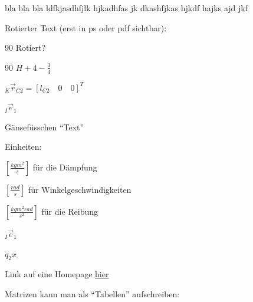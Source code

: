 \begin{list}{\bullet}{
 \setlength{\leftmargin}{4cm}
 \setlength{\labelsep}{1cm}
 \setlength{\labelwidth}{4cm}}

\item[Punkt 1] bla bla bla ldfkjasdhfjlk hjkadhfas jk
dkashfjkas hjkdf hajks ajd jkf

\item[Punkt 2]

\item[Punkt 3]

\end{list}





Rotierter Text (erst in ps oder pdf sichtbar):

\begin{rotate}{90}
Rotiert?
\end{rotate}

\vspace{2cm}

\begin{rotate}{90}
$H + 4 -\frac{3}{4}$
\end{rotate}




$_K\vec{r}_{C2} = [l_{C2} \quad 0 \quad 0 ]^T$

 $_I\vec{e}_1$

Gänsefüsschen   "`Text"'

Einheiten:

$[\frac{kgm^2}{s}]$ für die Dämpfung

$[\frac{rad}{s}]$ für Winkelgeschwindigkeiten

$[\frac{kgm^2rad}{s^2}]$ für die Reibung



$_I\vec{e}_1$

$\dot{q}_2x$


Link auf eine Homepage
\href{http://de.wikipedia.org/wiki/Welt}{hier}



Matrizen kann man als "`Tabellen"' aufschreiben:


